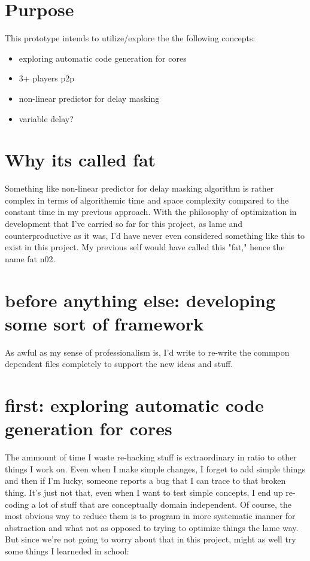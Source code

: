 \documentclass{article}
\begin{document}
\section{Purpose}

This prototype intends to utilize/explore the the following concepts:

\begin{itemize}
	\item exploring automatic code generation for cores
	\item 3+ players p2p
	\item non-linear predictor for delay masking
	\item variable delay?
\end{itemize}

\section{Why its called fat}

Something like non-linear predictor for delay masking algorithm is rather
 complex in terms of algorithemic time and space complexity compared to the
 constant time in my previous approach. With the philosophy of
 optimization in development that I've carried so far for this project, as lame
 and counterproductive as it was, I'd have never even considered something like
 this to exist in this project. My previous self would have called this "fat,"
 hence the name fat n02.


\section{before anything else: developing some sort of framework}

As awful as my sense of professionalism is, I'd write to re-write the commpon
 dependent files completely to support the new ideas and stuff.

\section{first: exploring automatic code generation for cores}
The ammount of time I waste re-hacking stuff is extraordinary in ratio to
 other things I work on. Even when I make simple changes, I forget to add
 simple things and then if I'm lucky, someone reports a bug that I can
 trace to that broken thing. It's just not that, even when I want to test
 simple concepts, I end up re-coding a lot of stuff that are conceptually
 domain independent. Of course, the most obvious way to reduce them is to
 program in more systematic manner for abstraction and what not as opposed
 to trying to optimize things the lame way. But since we're not going to
 worry about that in this project, might as well try some things I learneded
 in school:
 
\end{document}
